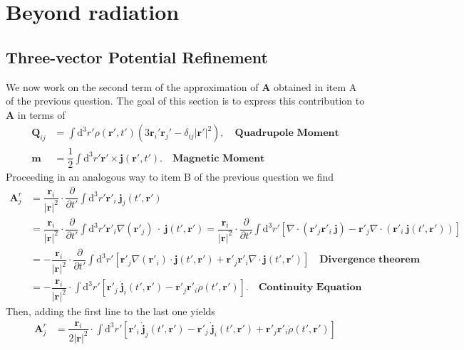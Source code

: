 \documentclass[10pt, a4paper]{article}
\begin{document}
{\section{Beyond radiation}
\subsection{Three-vector Potential Refinement}
We now work on the second term of the approximation of $\mathbf{A}$ obtained in item A of the previous question. The goal of this section is to express this contribution to $\mathbf{A}$ in terms of 
\begin{align*}
    \mathbf{Q}_{ij} &= \int \text{d}^3r' \rho(\mathbf{r}', t')(3\mathbf{r}_i'\mathbf{r}_j' - \delta_{ij}|\mathbf{r}'|^2),\quad \textbf{Quadrupole Moment}\\
    \mathbf{m} &= \dfrac{1}{2}\int \text{d}^3r' \mathbf{r}' \times \mathbf{j}(\mathbf{r}', t').\quad \textbf{Magnetic Moment}
\end{align*}
Proceeding in an analogous way to item B of the previous question we find
\begin{align*}
    \mathbf{A}^{r}_{j} &= \dfrac{\mathbf{r}_i}{|\mathbf{r}|^2} \cdot  \dfrac{\partial}{\partial t'}\int \text{d}^3r' \mathbf{r}'_i\  \mathbf{j}_j(t', \mathbf{r}') \\&= \dfrac{\mathbf{r}_i}{|\mathbf{r}|^2} \cdot  \dfrac{\partial}{\partial t'}\int \text{d}^3r' \mathbf{r}'_i \nabla(\mathbf{r}'_j)\ \cdot \  \mathbf{j}(t', \mathbf{r}') = \dfrac{\mathbf{r}_i}{|\mathbf{r}|^2} \cdot  \dfrac{\partial}{\partial t'}\int \text{d}^3r'  \left[\nabla \cdot (\mathbf{r}'_j \mathbf{r}'_i \ \mathbf{j}) - \mathbf{r}'_j \nabla \cdot (\mathbf{r}'_i \ \mathbf{j}(t', \mathbf{r}'))\right]\\
     &=- \dfrac{\mathbf{r}_i}{|\mathbf{r}|^2} \cdot  \dfrac{\partial}{\partial t'}\int \text{d}^3r'  \left[ \mathbf{r}'_j \nabla (\mathbf{r}'_i) \cdot \mathbf{j}(t', \mathbf{r}') + \mathbf{r}'_j \mathbf{r}'_i\nabla \cdot \mathbf{j}(t', \mathbf{r}')\right] \quad  \textbf{Divergence theorem}\\
     &=- \dfrac{\mathbf{r}_i}{|\mathbf{r}|^2} \cdot \int \text{d}^3r'  \left[ \mathbf{r}'_j \ \dot{\mathbf{j}}_i(t', \mathbf{r}') - \mathbf{r}'_j \mathbf{r}'_i \ddot{\rho}(t', \mathbf{r}')\right]. \quad  \textbf{Continuity Equation}
\end{align*}
Then, adding the first line to the last one yields
\begin{align*}
    \mathbf{A}^{r}_{j} 
     &=\dfrac{\mathbf{r}_i}{2|\mathbf{r}|^2} \cdot \int \text{d}^3r'  \left[ \mathbf{r}'_i\  \dot{\mathbf{j}}_j(t', \mathbf{r}')-\mathbf{r}'_j \ \dot{\mathbf{j}}_i(t', \mathbf{r}') + \mathbf{r}'_j \mathbf{r}'_i \ddot{\rho}(t', \mathbf{r}')\right] \\

\end{align*}}
\end{document}
